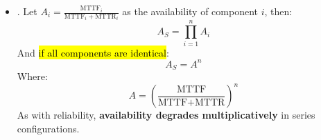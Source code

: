 \begin{itemize}
    \item {}. Let $A_i = \frac{\text{MTTF}_i}{\text{MTTF}_i + \text{MTTR}_i}$ as the availability of component $i$, then:
    \begin{equation}
        A_S = \displaystyle\prod_{i=1}^{n} A_i
    \end{equation}
    And \hl{if all components are identical}:
    \begin{equation*}
        A_S = A^{n}
    \end{equation*}
    Where:
    \begin{equation*}
        A = \left(\dfrac{\text{MTTF}}{\text{MTTF} + \text{MTTR}}\right)^{n}
    \end{equation*}
    As with reliability, \textbf{availability degrades multiplicatively} in series configurations.
\end{itemize}

\newpage

